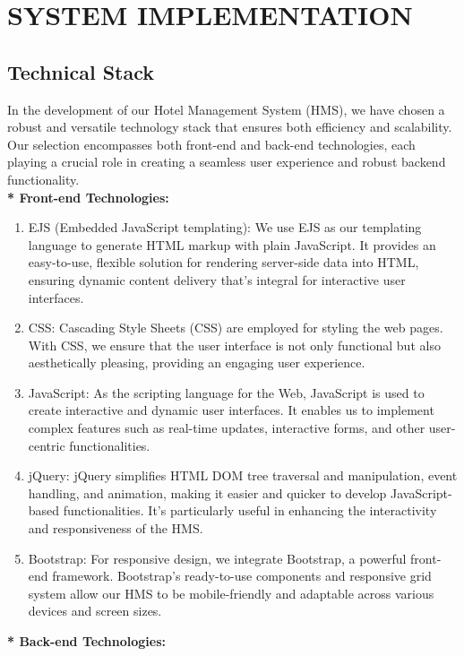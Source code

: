 \chapter{SYSTEM IMPLEMENTATION}
    \section{Technical Stack}
    In the development of our Hotel Management System (HMS), we have chosen a robust and versatile technology stack that ensures both efficiency and scalability. Our selection encompasses both front-end and back-end technologies, each playing a crucial role in creating a seamless user experience and robust backend functionality. \\
    \textbf{* Front-end Technologies:}
    \begin{enumerate}
        \item EJS (Embedded JavaScript templating): We use EJS as our templating language to generate HTML markup with plain JavaScript. It provides an easy-to-use, flexible solution for rendering server-side data into HTML, ensuring dynamic content delivery that's integral for interactive user interfaces.
        \item CSS: Cascading Style Sheets (CSS) are employed for styling the web pages. With CSS, we ensure that the user interface is not only functional but also aesthetically pleasing, providing an engaging user experience.
        \item JavaScript: As the scripting language for the Web, JavaScript is used to create interactive and dynamic user interfaces. It enables us to implement complex features such as real-time updates, interactive forms, and other user-centric functionalities.
        \item jQuery: jQuery simplifies HTML DOM tree traversal and manipulation, event handling, and animation, making it easier and quicker to develop JavaScript-based functionalities. It's particularly useful in enhancing the interactivity and responsiveness of the HMS.
        \item Bootstrap: For responsive design, we integrate Bootstrap, a powerful front-end framework. Bootstrap's ready-to-use components and responsive grid system allow our HMS to be mobile-friendly and adaptable across various devices and screen sizes.
    \end{enumerate}
    \textbf{* Back-end Technologies:}
